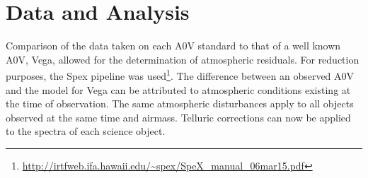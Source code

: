 \section{Data and Analysis}

Comparison of the data taken on each A0V standard to that of a well known A0V, Vega, allowed for the determination of atmospheric residuals.  %
For reduction purposes, the Spex pipeline was used\footnote{\url{http://irtfweb.ifa.hawaii.edu/~spex/SpeX_manual_06mar15.pdf}}.  The difference between an observed A0V and the model for Vega can be attributed to atmospheric conditions existing at the time of observation.  The same atmospheric disturbances apply to all objects observed at the same time and airmass. Telluric corrections can now be applied to the spectra of each science object.~\cite{Cushing_2004}